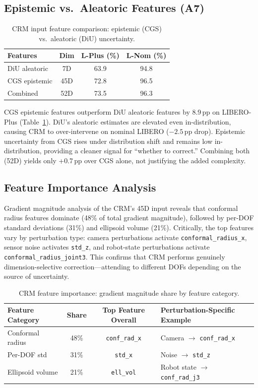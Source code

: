 \documentclass[letterpaper]{article}
\begin{document}
\subsection{Epistemic vs.\ Aleatoric Features (A7)}
\label{sec:a7}

\begin{table}[h]
\centering
\caption{CRM input feature comparison: epistemic (CGS) vs.\ aleatoric (DiU) uncertainty.}
\label{tab:a7}
\begin{tabular}{lccc}
\toprule
\textbf{Features} & \textbf{Dim} & \textbf{L-Plus (\%)} & \textbf{L-Nom (\%)} \\
\midrule
DiU aleatoric & 7D & 63.9 & 94.8 \\
CGS epistemic & 45D & 72.8 & 96.5 \\
Combined & 52D & 73.5 & 96.3 \\
\bottomrule
\end{tabular}
\end{table}

CGS epistemic features outperform DiU aleatoric features by 8.9\,pp on LIBERO-Plus (Table~\ref{tab:a7}).
DiU's aleatoric estimates are elevated even in-distribution, causing CRM to over-intervene on nominal LIBERO ($-2.5$\,pp drop).
Epistemic uncertainty from CGS rises under distribution shift and remains low in-distribution, providing a cleaner signal for ``whether to correct.''
Combining both (52D) yields only +0.7\,pp over CGS alone, not justifying the added complexity.

\subsection{Feature Importance Analysis}

Gradient magnitude analysis of the CRM's 45D input reveals that conformal radius features dominate (48\% of total gradient magnitude), followed by per-DOF standard deviations (31\%) and ellipsoid volume (21\%).
Critically, the top features vary by perturbation type: camera perturbations activate \texttt{conformal\_radius\_x}, sensor noise activates \texttt{std\_z}, and robot-state perturbations activate \texttt{conformal\_radius\_joint3}.
This confirms that CRM performs genuinely dimension-selective correction---attending to different DOFs depending on the source of uncertainty.

\begin{table}[h]
\centering
\caption{CRM feature importance: gradient magnitude share by feature category.}
\label{tab:feature}
\begin{tabular}{lccl}
\toprule
\textbf{Feature Category} & \textbf{Share} & \textbf{Top Feature Overall} & \textbf{Perturbation-Specific Example} \\
\midrule
Conformal radius & 48\% & \texttt{conf\_rad\_x} & Camera $\to$ \texttt{conf\_rad\_x} \\
Per-DOF std & 31\% & \texttt{std\_x} & Noise $\to$ \texttt{std\_z} \\
Ellipsoid volume & 21\% & \texttt{ell\_vol} & Robot state $\to$ \texttt{conf\_rad\_j3} \\
\bottomrule
\end{tabular}
\end{table}
\end{document}
